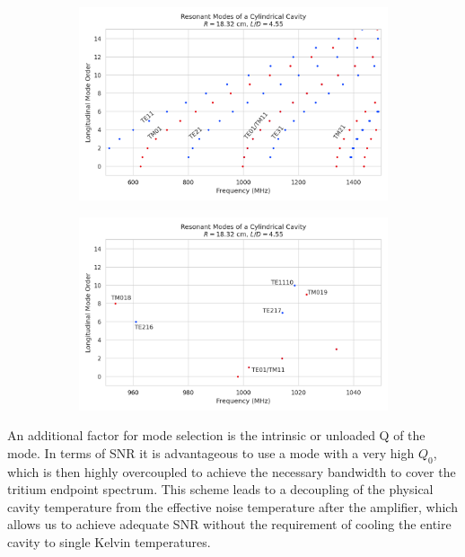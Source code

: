 \begin{figure}
    \centering
    \begin{subfigure}{0.67\textwidth}
        \centering
        \includegraphics*[width=1\textwidth]{figs/Chapter-6/230610_resmodes_1ghz_ld4pt5_wide.png}
        \caption{}
    \end{subfigure}
    \hfill
    \begin{subfigure}{0.67\textwidth}
        \centering
        \includegraphics*[width=1\textwidth]{figs/Chapter-6/230610_resmodes_1ghz_ld4pt5.png}
        \caption{}
    \end{subfigure}
    \caption{}
\end{figure}

An additional factor for mode selection is the intrinsic or unloaded Q of the mode. In terms of SNR it is advantageous to use a mode with a very high $Q_0$, which is then highly overcoupled to achieve the necessary bandwidth to cover the tritium endpoint spectrum. This scheme leads to a decoupling of the physical cavity temperature from the effective noise temperature after the amplifier, which allows us to achieve adequate SNR without the requirement of cooling the entire cavity to single Kelvin temperatures. 

